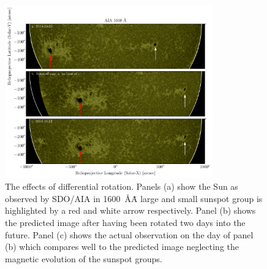 \begin{figure}
    \center
    \includegraphics[width = 0.8\textwidth]{figures/fig_diff_rot_1600.pdf}
    \caption{The effects of differential rotation.
    Panels (a) show the Sun as observed by SDO/AIA in 1600~\AA\.
    A large and small sunspot group is highlighted by a red and white arrow respectively. 
    Panel (b) shows the predicted image after having been rotated two days into the future.
    Panel (c) shows the actual observation on the day of panel (b) which compares well to the predicted image neglecting the magnetic evolution of the sunspot groups.}
    \label{fig:diff_rot}
\end{figure}
